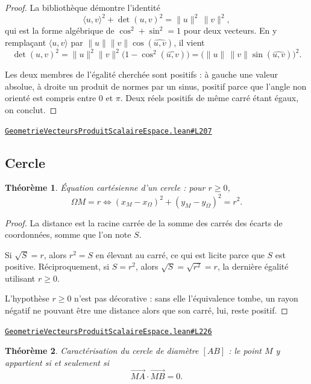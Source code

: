 \documentclass[11pt,a4paper]{article}
\theoremstyle{definition}
\theoremstyle{plain}
\newtheorem{theoreme}{Théorème}
\newcommand{\source}[2]{\par\smallskip\noindent\hfill{\footnotesize\href{#1}{\texttt{#2}}}\par\smallskip}
\begin{document}
\begin{proof}
La bibliothèque démontre l'identité
\[ \langle u, v\rangle^{2} + \det(u, v)^{2} = \|u\|^{2}\,\|v\|^{2} , \]
qui est la forme algébrique de \og{} $\cos^{2} + \sin^{2} = 1$ \fg{} pour deux vecteurs.
En y remplaçant $\langle u, v\rangle$ par $\|u\|\|v\|\cos(\widehat{u,v})$, il vient
\[ \det(u, v)^{2}
   = \|u\|^{2}\|v\|^{2}\bigl(1 - \cos^{2}(\widehat{u,v})\bigr)
   = \bigl(\|u\|\,\|v\|\sin(\widehat{u,v})\bigr)^{2} . \]

Les deux membres de l'égalité cherchée sont positifs : à gauche une valeur absolue, à
droite un produit de normes par un sinus, positif parce que l'angle non orienté est compris
entre $0$ et $\pi$. Deux réels positifs de même carré étant égaux, on conclut.
\end{proof}
\source{https://github.com/Commutator-IO/learn-lean/blob/main/cours/02-lycee/08-geometrie-vecteurs-produit-scalaire-espace/GeometrieVecteursProduitScalaireEspace.lean\#L207}{GeometrieVecteursProduitScalaireEspace.lean\#L207}

\subsection{Cercle}

\begin{theoreme}
Équation cartésienne d'un cercle : pour $r \ge 0$,
\[ \Omega M = r \iff (x_M - x_\Omega)^{2} + (y_M - y_\Omega)^{2} = r^{2} . \]
\end{theoreme}

\begin{proof}
La distance est la racine carrée de la somme des carrés des écarts de coordonnées, somme
que l'on note $S$.

Si $\sqrt{S} = r$, alors $r^{2} = S$ en élevant au carré, ce qui est licite parce que $S$
est positive. Réciproquement, si $S = r^{2}$, alors $\sqrt{S} = \sqrt{r^{2}} = r$, la
dernière égalité utilisant $r \ge 0$.

\medskip\noindent
L'hypothèse $r \ge 0$ n'est pas décorative : sans elle l'équivalence tombe, un rayon
négatif ne pouvant être une distance alors que son carré, lui, reste positif.
\end{proof}
\source{https://github.com/Commutator-IO/learn-lean/blob/main/cours/02-lycee/08-geometrie-vecteurs-produit-scalaire-espace/GeometrieVecteursProduitScalaireEspace.lean\#L226}{GeometrieVecteursProduitScalaireEspace.lean\#L226}

\begin{theoreme}
Caractérisation du cercle de diamètre $[AB]$ : le point $M$ y appartient si et seulement si
\[ \overrightarrow{MA} \cdot \overrightarrow{MB} = 0 . \]
\end{theoreme}
\end{document}
